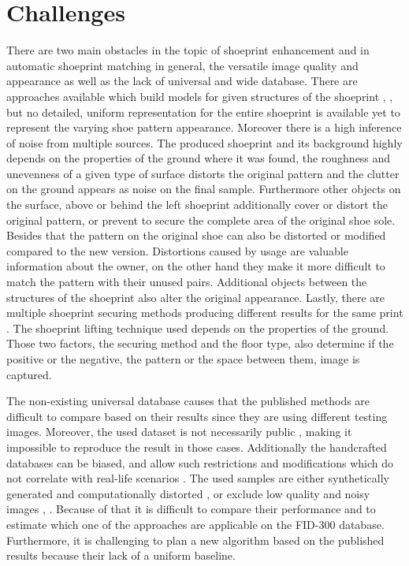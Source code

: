 \documentclass[draft,final]{vutinfth} %
\begin{document}
\section{Challenges}
\par
There are two main obstacles in the topic of shoeprint enhancement and in automatic shoeprint matching in general, the versatile image quality and appearance as well as the lack of universal and wide database.
There are approaches available which build models for given structures of the shoeprint \cite{tang2010footwear}, \cite{alizadeh2017automatic}, but no detailed, uniform representation for the entire shoeprint is available yet to represent the varying shoe pattern appearance.
Moreover there is a high inference of noise from multiple sources.
The produced shoeprint and its background highly depends on the properties of the ground where it was found, the roughness and unevenness of a given type of surface distorts the original pattern and the clutter on the ground appears as noise on the final sample.
Furthermore other objects on the surface, above or behind the left shoeprint additionally cover or distort the original pattern, or prevent to secure the complete area of the original shoe sole.
Besides that the pattern on the original shoe can also be distorted or modified compared to the new version.
Distortions caused by usage are valuable information about the owner, on the other hand they make it more difficult to match the pattern with their unused pairs.
Additional objects between the structures of the shoeprint also alter the original appearance.
Lastly, there are multiple shoeprint securing methods producing different results for the same print \cite{katireddy2017novel}. 
The shoeprint lifting technique used depends on the properties of the ground. 
Those two factors, the securing method and the floor type, also determine if the positive or the negative, the pattern or the space between them, image is captured.
\par
The non-existing universal database causes that the published methods are difficult to compare based on their results since they are using different testing images.
Moreover, the used dataset is not necessarily public \cite{katireddy2017novel}, \cite{dardi2009texture} making it impossible to reproduce the result in those cases.
Additionally the handcrafted databases can be biased, and allow such restrictions and modifications which do not correlate with real-life scenarios \cite{rida2019forensic}.
The used samples are either synthetically generated and computationally distorted \cite{de2005automated}, \cite{gueham2008automatic} or exclude low quality and noisy images \cite{dardi2009texture}, \cite{tang2010footwear}.
Because of that it is difficult to compare their performance and to estimate which one of the approaches are applicable on the FID-300 database.
Furthermore, it is challenging to plan a new algorithm based on the published results because their lack of a uniform baseline.
\end{document}
